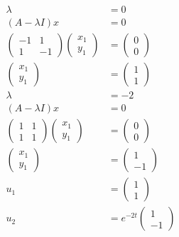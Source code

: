\documentclass[main.tex]{subfiles}
\begin{document}
\begin{enumerate}
    $$
    \begin{aligned}
    \lambda & = 0\\
    (A-\lambda I) x&=0\\
    \left(\begin{array}{cc}
    -1 & 1 \\
    1 & -1
    \end{array}\right)\left(\begin{array}{l}
    x_{1} \\
    y_{1}
    \end{array}\right) &=\left(\begin{array}{l}
    0 \\
    0
    \end{array}\right) \\
    \left(\begin{array}{l}
    x_{1} \\
    y_{1}
    \end{array}\right) &=\left(\begin{array}{l}
    1 \\
    1
    \end{array}\right)\\
    \lambda & = -2\\
    (A-\lambda I) x&=0\\
    \left(\begin{array}{ll}
    1 & 1 \\
    1 & 1
    \end{array}\right)\left(\begin{array}{l}
    x_{1} \\
    y_{1}
    \end{array}\right) &=\left(\begin{array}{l}
    0 \\
    0
    \end{array}\right) \\
    \left(\begin{array}{l}
    x_{1} \\
    y_{1}
    \end{array}\right) &=\left(\begin{array}{l}
    1 \\
    -1
    \end{array}\right)\\
    u_{1}&=\left(\begin{array}{l}
    1 \\
    1
    \end{array}\right) \\
    u_{2}&=e^{-2 t}\left(\begin{array}{l}
    1 \\
    -1
    \end{array}\right)
    \end{aligned}
    $$


\end{enumerate}
\end{document}
